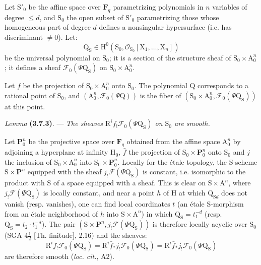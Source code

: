 \documentclass[11pt,leqno]{article}
\begin{document}
Let \(\mathrm S'_0\) be the affine space over \(\mathbf F_q\) parametrizing polynomials in \(n\) variables of degree \(\leq d\), and \(\mathrm S_0\) the open subset of \(\mathrm S'_0\) parametrizing those whose homogeneous part of degree \(d\) defines a nonsingular hypersurface (i.e. has discriminant \(\ne0\)). Let:
\[
\mathrm Q_{\mathrm S}\in
\mathrm H^0(\mathrm S_0,\mathscr O_{\mathrm S_0}[\mathrm X_1,\ldots,\mathrm X_n])
\]
be the universal polynomial on \(\mathrm S_0\); it is a section of the structure sheaf of \(\mathrm S_0\times\mathrm A_0^n\); it defines a sheaf \(\mathscr F_0(\Psi\mathrm Q_{\mathrm S})\) on \(\mathrm S_0\times\mathrm A_0^n\).

Let \(f\) be the projection of \(\mathrm S_0\times\mathrm A_0^n\) onto \(\mathrm S_0\). The polynomial \(\mathrm Q\) corresponds to a rational point of \(\mathrm S_0\), and \((\mathrm A_0^n,\mathscr F_0(\Psi\mathrm Q))\) is the fiber of \((\mathrm S_0\times\mathrm A_0^n,\mathscr F_0(\Psi\mathrm Q_{\mathrm S}))\) at this point.

\textit{Lemma} \textbf{(3.7.3)}. — \textit{The sheaves \(\mathrm R^if_!\mathscr F_0(\Psi\mathrm Q_{\mathrm S})\) on \(\mathrm S_0\) are smooth.}

Let \(\mathbf P_0^n\) be the projective space over \(\mathbf F_q\) obtained from the affine space \(\mathrm A_0^n\) by adjoining a hyperplane at infinity \(\mathrm H_0\), \(\bar f\) the projection of \(\mathrm S_0\times\mathbf P_0^n\) onto \(\mathrm S_0\) and \(j\) the inclusion of \(\mathrm S_0\times\mathrm A_0^n\) into \(\mathrm S_0\times\mathbf P_0^n\). Locally for the étale topology, the \(\mathrm S\)-scheme \(\mathrm S\times\mathbf P^n\) equipped with the sheaf \(j_!\mathscr F(\Psi\mathrm Q_{\mathrm S})\) is constant, i.e. isomorphic to the product with \(\mathrm S\) of a space equipped with a sheaf. This is clear on \(\mathrm S\times\mathrm A^n\), where \(j_!\mathscr F(\Psi\mathrm Q_{\mathrm S})\) is locally constant, and near a point \(h\) of \(\mathrm H\) at which \(\mathrm Q_{\mathrm S d}\) does not vanish (resp. vanishes), one can find local coordinates \(t\) (an étale \(\mathrm S\)-morphism from an étale neighborhood of \(h\) into \(\mathrm S\times\mathrm A^n\)) in which \(\mathrm Q_{\mathrm S}=t_1^{-d}\) (resp. \(\mathrm Q_{\mathrm S}=t_2\cdot t_1^{-d}\)). The pair \((\mathrm S\times\mathbf P^n,j_!\mathscr F(\Psi\mathrm Q_{\mathrm S}))\) is therefore locally acyclic over \(\mathrm S_0\) (SGA \(4\frac{1}{2}\) [Th. finitude], 2.16) and the sheaves:
\[
\mathrm R^if_!\mathscr F_0(\Psi\mathrm Q_{\mathrm S})
=
\mathrm R^i\bar f_*j_!\mathscr F_0(\Psi\mathrm Q_{\mathrm S})
=
\mathrm R^i\bar f_*j_!\mathscr F_0(\Psi\mathrm Q_{\mathrm S})
\]
are therefore smooth (\textit{loc. cit.}, A2).
\end{document}
